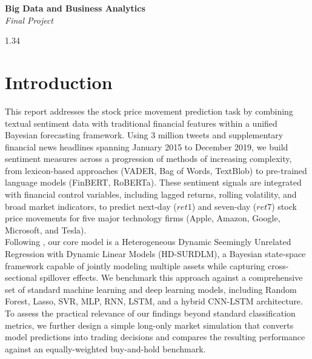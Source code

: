 \documentclass{article}
\begin{document}
\setlength{\parindent}{0pt}
\setlength{\bibitemsep}{0.5\baselineskip}

\begin{flushleft}
\end{flushleft}

\vspace{8pt}

\begin{center}
    \large\textbf{Big Data and Business Analytics} \\[1pt]
    \large\textit{Final Project} \\[8pt]
\end{center}

\vspace{4pt}

\begin{setstretch}{1.34}
\section{Introduction}

This report addresses the stock price movement prediction task by combining textual sentiment data with traditional financial features within a unified Bayesian forecasting framework. Using 3 million tweets and supplementary financial news headlines spanning January 2015 to December 2019, we build sentiment measures across a progression of methods of increasing complexity, from lexicon-based approaches (VADER, Bag of Words, TextBlob) to pre-trained language models (FinBERT, RoBERTa). These sentiment signals are integrated with financial control variables, including lagged returns, rolling volatility, and broad market indicators, to predict next-day ($ret1$) and seven-day ($ret7$) stock price movements for five major technology firms (Apple, Amazon, Google, Microsoft, and Tesla). \\

Following \textcite{shao2025revisiting}, our core model is a Heterogeneous Dynamic Seemingly Unrelated Regression with Dynamic Linear Models (HD-SURDLM), a Bayesian state-space framework capable of jointly modeling multiple assets while capturing cross-sectional spillover effects. We benchmark this approach against a comprehensive set of standard machine learning and deep learning models, including Random Forest, Lasso, SVR, MLP, RNN, LSTM, and a hybrid CNN-LSTM architecture. To assess the practical relevance of our findings beyond standard classification metrics, we further design a simple long-only market simulation that converts model predictions into trading decisions and compares the resulting performance against an equally-weighted buy-and-hold benchmark.


\end{setstretch}
\end{document}
